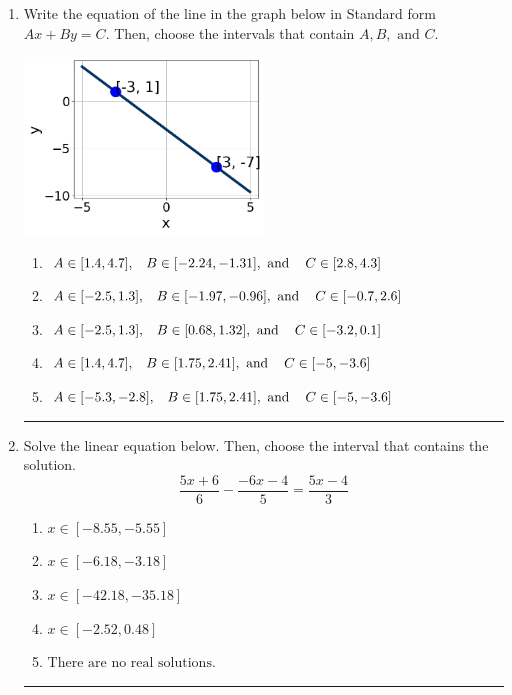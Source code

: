 \documentclass[14pt]{extbook}
\newcommand{\litem}[1]{\item#1\hspace*{-1cm}\rule{\textwidth}{0.4pt}}
\begin{document}
\begin{enumerate}
{\begin{enumerate}[label=\Alph*.]
\end{enumerate} }
\litem{
Write the equation of the line in the graph below in Standard form $Ax+By=C$. Then, choose the intervals that contain $A, B, \text{ and } C$.
\begin{center}
    \includegraphics[width=0.5\textwidth]{../Figures/linearGraphToStandardB.png}
\end{center}
\begin{enumerate}[label=\Alph*.]
\item \( A \in [1.4, 4.7], \hspace{3mm} B \in [-2.24, -1.31], \text{ and } \hspace{3mm} C \in [2.8, 4.3] \)
\item \( A \in [-2.5, 1.3], \hspace{3mm} B \in [-1.97, -0.96], \text{ and } \hspace{3mm} C \in [-0.7, 2.6] \)
\item \( A \in [-2.5, 1.3], \hspace{3mm} B \in [0.68, 1.32], \text{ and } \hspace{3mm} C \in [-3.2, 0.1] \)
\item \( A \in [1.4, 4.7], \hspace{3mm} B \in [1.75, 2.41], \text{ and } \hspace{3mm} C \in [-5, -3.6] \)
\item \( A \in [-5.3, -2.8], \hspace{3mm} B \in [1.75, 2.41], \text{ and } \hspace{3mm} C \in [-5, -3.6] \)

\end{enumerate} }
\litem{
Solve the linear equation below. Then, choose the interval that contains the solution.\[ \frac{5x + 6}{6} - \frac{-6x -4}{5} = \frac{5x -4}{3} \]\begin{enumerate}[label=\Alph*.]
\item \( x \in [-8.55, -5.55] \)
\item \( x \in [-6.18, -3.18] \)
\item \( x \in [-42.18, -35.18] \)
\item \( x \in [-2.52, 0.48] \)
\item \( \text{There are no real solutions.} \)


\end{enumerate}}
\end{enumerate}
\end{document}
